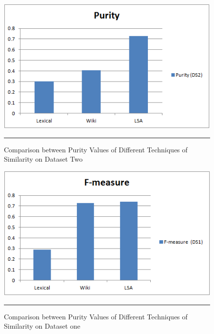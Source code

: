 \begin{figure}[htbp]
	\centering
		\includegraphics{./Figures/Purity_DS2_1.png}
		\rule{35em}{0.5pt}
	\caption[Comparison between Purity Values of Different Techniques of Similarity on Dataset Two]{Comparison between Purity Values of Different Techniques of Similarity on Dataset Two}
	\label{fig:F121}
\end{figure}
\clearpage
\begin{figure}[htbp]
	\centering
		\includegraphics{./Figures/F_DS1_1.png}
		\rule{35em}{0.5pt}
	\caption[Comparison between Purity Values of Different Techniques of Similarity on Dataset one]{Comparison between Purity Values of Different Techniques of Similarity on Dataset one}
	\label{fig:F50}
\end{figure}


